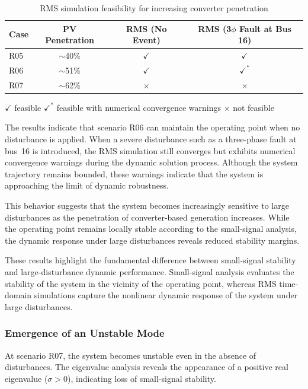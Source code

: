 \begin{table}[htbp]
\centering
\caption{RMS simulation feasibility for increasing converter penetration}
\label{tab:rms_feasibility}
\begin{tabular}{lccc}
\hline
Case & PV Penetration & RMS (No Event) & RMS (3$\phi$ Fault at Bus 16) \\
\hline
R05 & $\sim$40\% & $\checkmark$ & $\checkmark$ \\
R06 & $\sim$51\% & $\checkmark$ & $\checkmark^{*}$ \\
R07 & $\sim$62\% & $\times$ & $\times$ \\
\hline
\end{tabular}

\vspace{2mm}
\small
$\checkmark$ feasible \qquad
$\checkmark^{*}$ feasible with numerical convergence warnings \qquad
$\times$ not feasible
\end{table}

The results indicate that scenario R06 can maintain the operating point when no disturbance is applied. When a severe disturbance such as a three-phase fault at bus~16 is introduced, the RMS simulation still converges but exhibits numerical convergence warnings during the dynamic solution process. Although the system trajectory remains bounded, these warnings indicate that the system is approaching the limit of dynamic robustness.

This behavior suggests that the system becomes increasingly sensitive to large disturbances as the penetration of converter-based generation increases. While the operating point remains locally stable according to the small-signal analysis, the dynamic response under large disturbances reveals reduced stability margins.

These results highlight the fundamental difference between small-signal stability and large-disturbance dynamic performance. Small-signal analysis evaluates the stability of the system in the vicinity of the operating point, whereas RMS time-domain simulations capture the nonlinear dynamic response of the system under large disturbances.

\subsubsection{Emergence of an Unstable Mode}

At scenario R07, the system becomes unstable even in the absence of disturbances. The eigenvalue analysis reveals the appearance of a positive real eigenvalue ($\sigma > 0$), indicating loss of small-signal stability.

